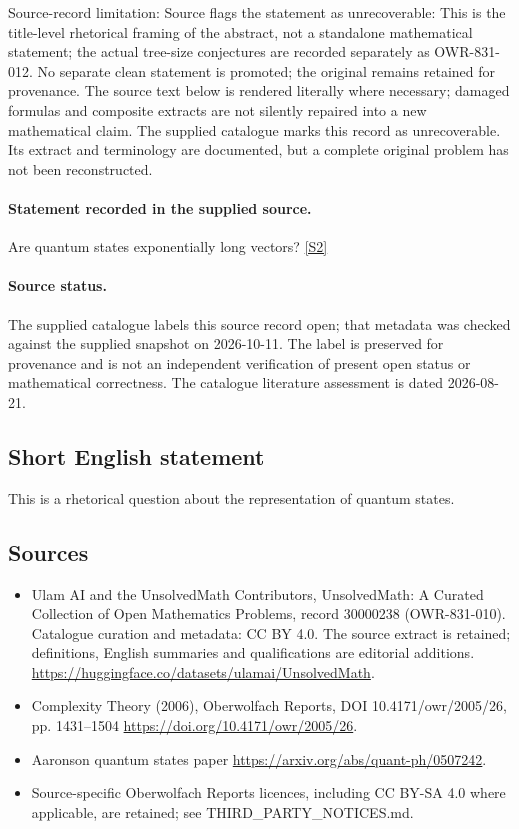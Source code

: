 \documentclass[11pt]{article}
\begin{document}
Source-record limitation: Source flags the statement as unrecoverable: This is the title-level rhetorical framing of the abstract, not a standalone mathematical statement; the actual tree-size conjectures are recorded separately as OWR-831-012. No separate clean statement is promoted; the original remains retained for provenance.
The source text below is rendered literally where necessary; damaged formulas and composite extracts are not silently repaired into a new mathematical claim.
The supplied catalogue marks this record as unrecoverable. Its extract and terminology are documented, but a complete original problem has not been reconstructed.
\paragraph{Statement recorded in the supplied source.}
Are quantum states exponentially long vectors? \href{https://doi.org/10.4171/owr/2005/26}{[S2]}
\paragraph{Source status.}
The supplied catalogue labels this source record open; that metadata was checked against the supplied snapshot on 2026-10-11. The label is preserved for provenance and is not an independent verification of present open status or mathematical correctness. The catalogue literature assessment is dated 2026-08-21.
\subsection{Short English statement}
This is a rhetorical question about the representation of quantum states.
\subsection{Sources}
\begin{itemize}
\item[S1] Ulam AI and the UnsolvedMath Contributors, UnsolvedMath: A Curated Collection of Open Mathematics Problems, record 30000238 (OWR-831-010). Catalogue curation and metadata: CC BY 4.0. The source extract is retained; definitions, English summaries and qualifications are editorial additions.
\url{https://huggingface.co/datasets/ulamai/UnsolvedMath}.
\item[S2] Complexity Theory (2006), Oberwolfach Reports, DOI 10.4171/owr/2005/26, pp. 1431--1504
\url{https://doi.org/10.4171/owr/2005/26}.
\item[S3] Aaronson quantum states paper
\url{https://arxiv.org/abs/quant-ph/0507242}.
\item Source-specific Oberwolfach Reports licences, including CC BY-SA 4.0 where applicable, are retained; see THIRD\_PARTY\_NOTICES.md.
\end{itemize}
\end{document}
